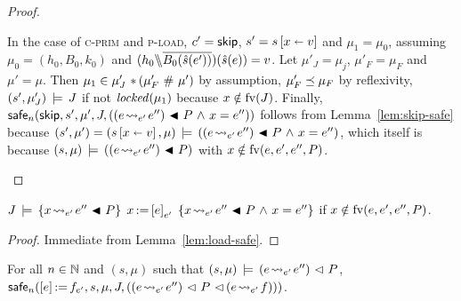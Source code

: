\documentclass[11pt]{report}
\begin{document}
\begin{proof}
\begin{enumerate}
		In the case of \textsc{c-prim} and \textsc{p-load}, $c' = \operatorname{\mathsf{skip}}$, $s' = s \left[ x \shortleftarrow v \right]$ and $\mu_1 = \mu_0$, assuming $\mu_0 = (h_0,B_0,k_0)$ and $(h_0 \backslash\!\!\backslash \overline{B_0(\hat{s}(e'))})(\hat{s}(e)) = v$. Let $\mu'_J = \mu_j$, $\mu'_F = \mu_F$ and $\mu' = \mu$. Then $\mu_1 \in \mu'_J \operatorname{\,\ast\,} (\mu'_F \operatorname{\,\#\,} \mu')$ by assumption, $\mu'_F \preceq \mu_F$ by reflexivity, $(s',\mu'_J) \,\models\, J$ if not $\mathit{locked}(\mu_1)$ because $x \notin \mathrm{fv}(J)$. Finally, $\mathsf{safe}_{n}(\operatorname{\mathsf{skip}},s',\mu',J,((e \!\leadsto_{e'}\! e'') \operatorname{\,\blacktriangleleft\,} P \operatorname{\,\wedge\,} x = e''))$ follows from Lemma~\ref{lem:skip-safe} because $(s',\mu') = (s \left[ x \shortleftarrow v \right],\mu) \,\models\, ((e \!\leadsto_{e'}\! e'') \operatorname{\,\blacktriangleleft\,} P \operatorname{\,\wedge\,} x = e'')$, which itself is because $(s,\mu) \,\models\, ((e \!\leadsto_{e'}\! e'') \operatorname{\,\blacktriangleleft\,} P)$ with $x \notin \mathrm{fv}(e,e',e'',P)$. 
	\end{enumerate}
\end{proof}

\begin{lemma}
    \label{lem:load-sound}
    $J\,\models\,\left\lbrace x \!\leadsto_{e'}\! e'' \operatorname{\,\blacktriangleleft\,} P \right\rbrace\;x \operatorname{:\!=} \left[ e \right]_{e'}\;\left\lbrace x \!\leadsto_{e'}\! e'' \operatorname{\,\blacktriangleleft\,} P \operatorname{\,\wedge\,} x = e'' \right\rbrace$ if $x \notin \mathrm{fv}(e,e',e'',P)$. 
\end{lemma} 

\begin{proof}
    Immediate from Lemma~\ref{lem:load-safe}. 
\end{proof}

\begin{lemma}
    \label{lem:store-safe}
    For all $n \in \mathbb{N}$ and $(s,\mu)$ such that $(s,\mu) \,\models\, (e \!\leadsto_{e'}\! e'') \operatorname{\,\vartriangleleft\,} P$, $\mathsf{safe}_{n}(\left[ e \right] \operatorname{:\!=} f_{e'},s,\mu,J,\left((e \!\leadsto_{e'}\! e'') \operatorname{\,\vartriangleleft\,} P \operatorname{\,\vartriangleleft\,} (e \!\leadsto_{e'}\! f)\right))$. 
\end{lemma}
\end{document}
